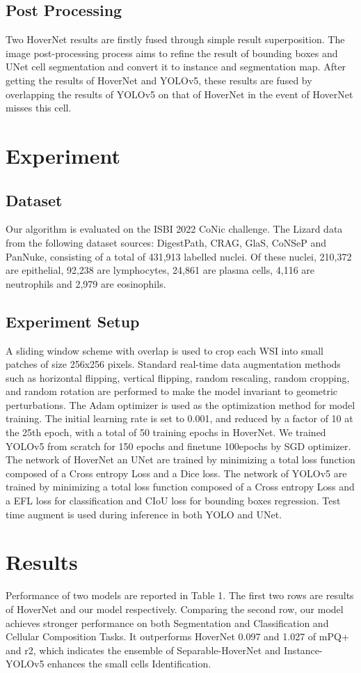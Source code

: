 \documentclass[conference]{IEEEtran}
\begin{document}
\subsection{Post Processing}
Two HoverNet results are firstly fused through simple result superposition. The image post-processing process aims to refine the result of bounding boxes and UNet cell segmentation and convert it to instance and segmentation map. After getting the results of HoverNet and YOLOv5, these results are fused by overlapping the results of YOLOv5 on that of HoverNet in the event of HoverNet misses this cell.

\section{Experiment}
\subsection{Dataset}
Our algorithm is evaluated on the ISBI 2022 CoNic challenge. The Lizard\cite{b8} data from the following dataset sources: DigestPath, CRAG, GlaS, CoNSeP and PanNuke, consisting of a total of 431,913 labelled nuclei. Of these nuclei, 210,372 are epithelial, 92,238 are lymphocytes, 24,861 are plasma cells, 4,116 are neutrophils and 2,979 are eosinophils. 
\subsection{Experiment Setup}
A sliding window scheme with overlap is used to crop each WSI into small patches of size 256x256 pixels. Standard real-time data augmentation methods such as horizontal flipping, vertical flipping, random rescaling, random cropping, and random rotation are performed to make the model invariant to geometric perturbations. The Adam optimizer is used as the optimization method for model training. The initial learning rate is set to 0.001, and reduced by a factor of 10 at the 25th epoch, with a total of 50 training epochs in HoverNet. We trained YOLOv5 from scratch for 150 epochs and finetune 100epochs by SGD optimizer. The network of HoverNet an UNet are trained by minimizing a total loss function composed of a Cross entropy Loss and a Dice loss. The network of YOLOv5 are trained by minimizing a total loss function composed of a Cross entropy Loss and a EFL loss for classification and CIoU loss for bounding boxes regression. Test time augment is used during inference in both YOLO and UNet.
\section{Results}
Performance of two models are reported in Table 1. The first two rows are results of HoverNet and our model respectively. Comparing the second row, our model achieves stronger performance on both Segmentation and Classification and Cellular Composition Tasks. It outperforms HoverNet 0.097 and 1.027 of mPQ+ and r2, which indicates the ensemble of Separable-HoverNet and Instance-YOLOv5 enhances the small cells Identification.
\end{document}
